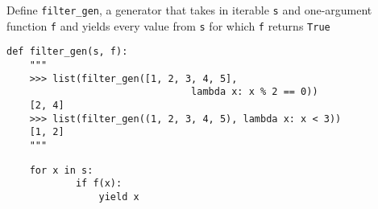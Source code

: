 \begin{blocksection}
\question Define \lstinline$filter_gen$, a generator that takes in iterable \lstinline$s$ and one-argument function  \lstinline$f$ and yields every value
from  \lstinline$s$ for which \lstinline$f$ returns  \lstinline$True$

\begin{lstlisting}
def filter_gen(s, f):
    """
    >>> list(filter_gen([1, 2, 3, 4, 5],
                                lambda x: x % 2 == 0))
    [2, 4]
    >>> list(filter_gen((1, 2, 3, 4, 5), lambda x: x < 3))
    [1, 2]
    """
\end{lstlisting}

\begin{solution}[1.5in]
\begin{lstlisting}
	for x in s:
            if f(x):
                yield x
\end{lstlisting}
\end{solution}
\end{blocksection}

